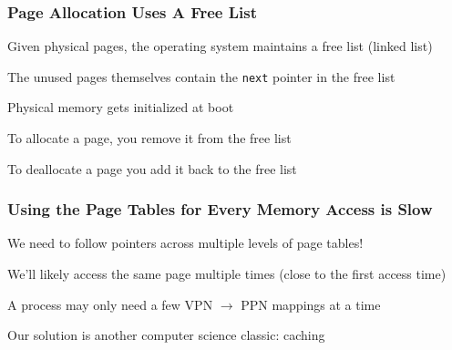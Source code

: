   \begin{frame}
    \frametitle{Page Allocation Uses A Free List}

    Given physical pages, the operating system maintains a free list (linked list)

    \vspace{2em}

    The unused pages themselves contain the \texttt{next} pointer in the free list

    \hspace{2em} Physical memory gets initialized at boot

    \vspace{2em}

    To allocate a page, you remove it from the free list

    \hspace{2em} To deallocate a page you add it back to the free list
  \end{frame}

  \begin{frame}
    \frametitle{Using the Page Tables for Every Memory Access is Slow}

    We need to follow pointers across multiple levels of page tables!

    \vspace{2em}

    We'll likely access the same page multiple times (close to the first access time)

    \vspace{2em}

    A process may only need a few VPN $\rightarrow$ PPN mappings at a time

    \vspace{2em}

    Our solution is another computer science classic: caching
  \end{frame}

